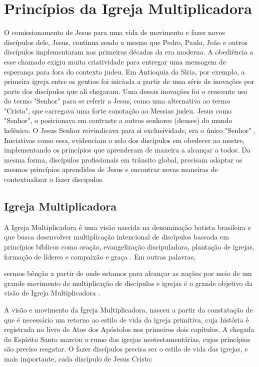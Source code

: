 \documentclass[12pt,openright,oneside,a4paper,
english,french,spanish,brazil]{abntex2}
\begin{document}
\chapter{Princípios da Igreja Multiplicadora}

O comissionamento de Jesus para uma vida de movimento e fazer novos discípulos dele, Jesus, continua sendo o mesmo que Pedro, Paulo, João e outros discípulos implementaram nas primeiras décadas da era moderna. A obediência a esse chamado exigiu muita criatividade para entregar uma mensagem de esperança para fora do contexto judeu. Em Antioquia da Síria, por exemplo, a primeira igreja entre os gentios foi iniciada a partir de uma série de inovações por parte dos discípulos que ali chegaram. Uma dessas inovações foi o crescente uso do termo "Senhor" para se referir a Jesus, como uma alternativa ao termo "Cristo", que carregava uma forte conotação ao Messias judeu. Jesus como "Senhor", o posicionava em contraste a outros senhores (deuses) do mundo helênico. O Jesus Senhor reivindicava para si exclusividade, era o único "Senhor" \cite[p. 170]{green}. Iniciativas como essa, evidenciam o zelo dos discípulos em obedecer ao mestre, implementando os princípios que aprenderam de maneira a alcançar a todos. Da mesma forma, discípulos profissionais em trânsito global, precisam adaptar os mesmos princípios aprendidos de Jesus e encontrar novas maneiras de contextualizar o fazer discipulos.

\section{Igreja Multiplicadora}

A Igreja Multiplicadora é uma visão nascida na denominação batista brasileira e que busca desenvolver multiplicação intencional de discípulos baseada em princípios bíblicos como oração, evangelização discipuladora, plantação de igrejas, formação de líderes e compaixão e graça \cite{igrejaMultiplicVisaoSite}. Em outras palavras, 

\begin{citacao}sermos bênção a partir de onde estamos para alcançar as nações por meio de um grande movimento de multiplicação de discípulos e igrejas é o grande objetivo da visão de Igreja Multiplicadora \cite[p. 19]{freitas}.\end{citacao}

A visão e movimento da Igreja Multiplicadora, nasceu a partir da constatação de que é necessário um retorno ao estilo de vida da igreja primitiva, cuja história é registrada no livro de Atos dos Apóstolos nos primeiros dois capítulos. A chegada do Espírito Santo marcou o rumo das igrejas neotestamentárias, cujos princípios são preciso resgatar. O fazer discípulos precisa ser o estilo de vida das igrejas, e mais importante, cada discípulo de Jesus Cristo: 
\end{document}
